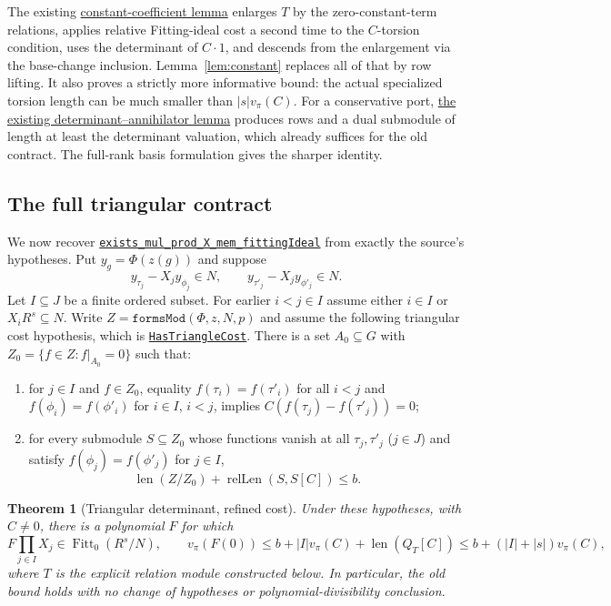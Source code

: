 \documentclass[11pt]{article}
\newtheorem{theorem}{Theorem}[section]
\newcommand{\Fitt}{\operatorname{Fitt}_0}
\newcommand{\len}{\operatorname{len}}
\newcommand{\rl}{\operatorname{relLen}}
\newcommand{\val}{v_\pi}
\newcommand{\src}[3]{\href{https://github.com/VladimirReshetnikov/ProveIt/blob/835c3695d07c0f77060c5cc63f92eeb52a7d21c2/Analysis/GeneralizedRiemannHypothesis/Lean/grh/src/#1.lean\#L#2}{#3}}
\newcommand{\fitlib}[2]{\src{Lib/General/Algebra/FittingIdealsAndLengths}{#1}{#2}}
\newcommand{\fb}[2]{\src{New/Congruences/FirstOrder/FittingBlock}{#1}{#2}}
\begin{document}
The existing \fb{65}{constant-coefficient lemma} enlarges $T$ by the zero-constant-term relations, applies relative Fitting-ideal cost a second time to the $C$-torsion condition, uses the determinant of $C\cdot1$, and descends from the enlargement via the base-change inclusion. Lemma~\ref{lem:constant} replaces all of that by row lifting. It also proves a strictly more informative bound: the actual specialized torsion length can be much smaller than $|s|\val(C)$. For a conservative port, \fitlib{303}{the existing determinant--annihilator lemma} produces rows and a dual submodule of length at least the determinant valuation, which already suffices for the old contract. The full-rank basis formulation gives the sharper identity.

\subsection{The full triangular contract}
We now recover \fb{137}{\texttt{exists\_mul\_prod\_X\_mem\_fittingIdeal}} from exactly the source's hypotheses. Put $y_g=\Phi(z(g))$ and suppose
\[
       y_{\tau_j}-X_j y_{\phi_j}\in N,\qquad
       y_{\tau'_j}-X_j y_{\phi'_j}\in N.
\]
Let $I\subseteq J$ be a finite ordered subset. For earlier $i<j\in I$ assume either $i\in I$ or $X_iR^s\subseteq N$. Write $Z=\texttt{formsMod}(\Phi,z,N,p)$ and assume the following triangular cost hypothesis, which is \fb{43}{\texttt{HasTriangleCost}}. There is a set $A_0\subseteq G$ with $Z_0=\{f\in Z:f|_{A_0}=0\}$ such that:
\begin{enumerate}[label=(\roman*)]
\item for $j\in I$ and $f\in Z_0$, equality $f(\tau_i)=f(\tau'_i)$ for all $i<j$ and $f(\phi_i)=f(\phi'_i)$ for $i\in I$, $i<j$, implies $C(f(\tau_j)-f(\tau'_j))=0$;
\item for every submodule $S\subseteq Z_0$ whose functions vanish at all $\tau_j,\tau'_j$ ($j\in J$) and satisfy $f(\phi_j)=f(\phi'_j)$ for $j\in I$,
\[
       \len(Z/Z_0)+\rl(S,S[C])\le b.
\]
\end{enumerate}
\begin{theorem}[Triangular determinant, refined cost]\label{thm:triangle}
Under these hypotheses, with $C\ne0$, there is a polynomial $F$ for which
\[
    F\prod_{j\in I}X_j\in\Fitt(R^s/N),\qquad
    \val(F(0))\le b+|I|\val(C)+\len(Q_T[C])
                 \le b+(|I|+|s|)\val(C),
\]
where $T$ is the explicit relation module constructed below. In particular, the old bound holds with no change of hypotheses or polynomial-divisibility conclusion.
\end{theorem}
\end{document}
